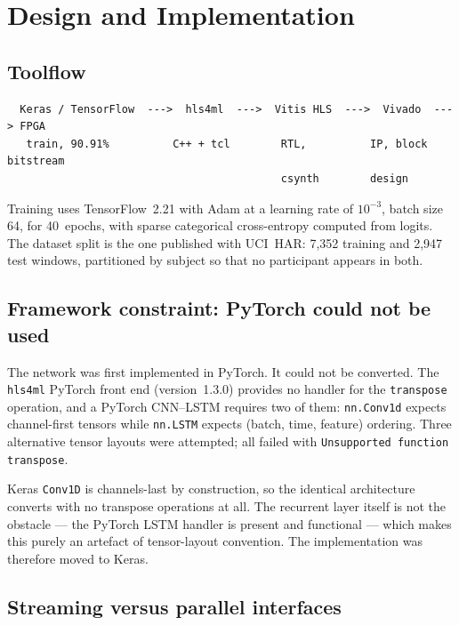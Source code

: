 \documentclass[11pt,a4paper]{article}
\begin{document}
\section{Design and Implementation}

\subsection{Toolflow}

\begin{verbatim}
  Keras / TensorFlow  --->  hls4ml  --->  Vitis HLS  --->  Vivado  ---> FPGA
   train, 90.91%          C++ + tcl        RTL,          IP, block    bitstream
                                           csynth        design
\end{verbatim}

Training uses TensorFlow~2.21 with Adam at a learning rate of $10^{-3}$, batch
size 64, for 40~epochs, with sparse categorical cross-entropy computed from
logits. The dataset split is the one published with UCI~HAR: 7{,}352 training
and 2{,}947 test windows, partitioned by subject so that no participant appears
in both.

\subsection{Framework constraint: PyTorch could not be used}

The network was first implemented in PyTorch. It could not be converted. The
\texttt{hls4ml} PyTorch front end (version~1.3.0) provides no handler for the
\texttt{transpose} operation, and a PyTorch CNN--LSTM requires two of them:
\texttt{nn.Conv1d} expects channel-first tensors while \texttt{nn.LSTM} expects
(batch, time, feature) ordering. Three alternative tensor layouts were
attempted; all failed with \texttt{Unsupported function transpose}.

Keras \texttt{Conv1D} is channels-last by construction, so the identical
architecture converts with no transpose operations at all. The recurrent layer
itself is not the obstacle --- the PyTorch LSTM handler is present and
functional --- which makes this purely an artefact of tensor-layout convention.
The implementation was therefore moved to Keras.

\subsection{Streaming versus parallel interfaces}
\label{sec:iostream}
\end{document}
